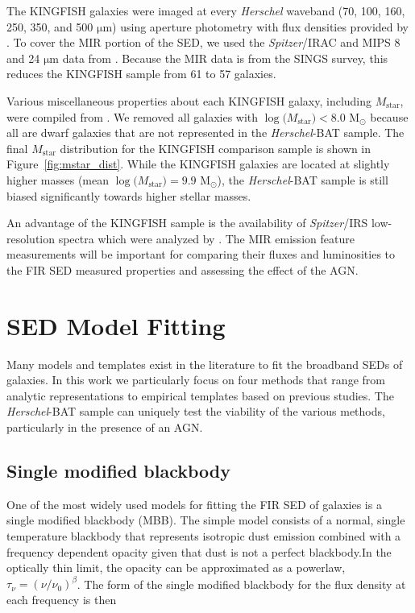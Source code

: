 \documentclass[fleqn,usenatbib]{mnras}
\newcommand{\herschel}{\emph{Herschel}}
\newcommand{\um}{$\mathrm{\mu}$m}
\newcommand{\msun}{M$_{\odot}$}
\newcommand{\mstar}{$M_{\mathrm{star}}$}
\begin{document}
The KINGFISH galaxies were imaged at every \herschel{} waveband (70, 100, 160, 250, 350, and 500 \um) using aperture photometry with flux densities provided by \citet{Dale:2012dq}. To cover the MIR portion of the SED, we used the \textit{Spitzer}/IRAC and MIPS 8 and 24 \um{} data from \citet{Dale:2007fk}. Because the MIR data is from the SINGS survey, this reduces the KINGFISH sample from 61 to 57 galaxies. 

Various miscellaneous properties about each KINGFISH galaxy, including \mstar, were compiled from \citet{Kennicutt:2011vn}. We removed all galaxies with $\log($\mstar$)<8.0$ \msun{} because all are dwarf galaxies that are not represented in the \herschel-BAT sample. The final \mstar{} distribution for the KINGFISH comparison sample is shown in Figure~\ref{fig:mstar_dist}. While the KINGFISH galaxies are located at slightly higher masses (mean $\log($\mstar$)=9.9$ \msun), the \herschel-BAT sample is still biased significantly towards higher stellar masses. 

An advantage of the KINGFISH sample is the availability of \textit{Spitzer}/IRS low-resolution spectra which were analyzed by \citet{Smith:2007lr}. The MIR emission feature measurements will be important for comparing their fluxes and luminosities to the FIR SED measured properties and assessing the effect of the AGN. 

\section{SED Model Fitting}
Many models and templates exist in the literature to fit the broadband SEDs of galaxies. In this work we particularly focus on four methods that range from analytic representations to empirical templates based on previous studies. The \herschel-BAT sample can uniquely test the viability of the various methods, particularly in the presence of an AGN. 

\subsection{Single modified blackbody}
One of the most widely used models for fitting the FIR SED of galaxies is a single modified blackbody (MBB). The simple model consists of a normal, single temperature blackbody that represents isotropic dust emission combined with a frequency dependent opacity given that dust is not a perfect blackbody.In the optically thin limit, the opacity can be approximated as a powerlaw, $\tau_{\nu}=(\nu/\nu_{0})^{\beta}$. The form of the single modified blackbody for the flux density at each frequency is then
\end{document}
